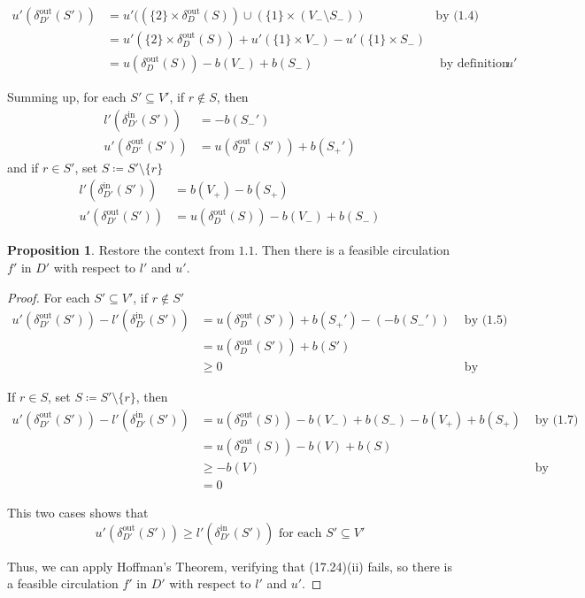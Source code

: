 \documentclass[a4paper,10pt, leqno]{article}
\theoremstyle{definition}
\begin{document}
\begin{align*}
 u'(\delta_{D'}^{\text{out}}(S')) &= u'((\{2\}\times\delta_{D}^{\text{out}}(S)) \cup (\{1\} \times (V_- \setminus S_-)) &\text{by (1.4)}\\
 &= u'(\{2\}\times\delta_{D}^{\text{out}}(S)) + u'(\{1\} \times V_-) - u'(\{1\} \times S_-) \\
 &= u(\delta_{D}^{\text{out}}(S)) - b(V_-) + b(S_-) &\text{ by definition of }u' 
\end{align*}

Summing up, for each $S' \subseteq V'$, if $r \notin S$, then
\begin{align*}
 \tag{1.5} l'(\delta_{D'}^{\text{in}}(S')) &= -b(S_-') \\
 \tag{1.6} u'(\delta_{D'}^{\text{out}}(S')) &= u(\delta_{D}^{\text{out}}(S')) + b(S_+')
\end{align*}
and if $r \in S'$, set $S \coloneqq S' \setminus \{r\} $
\begin{align*}
 \tag{1.7} l'(\delta_{D'}^{\text{in}}(S')) &= b(V_+) - b(S_+) \\
 \tag{1.8} u'(\delta_{D'}^{\text{out}}(S')) &= u(\delta_{D}^{\text{out}}(S)) - b(V_-) + b(S_-)
\end{align*}


\newtheorem{proposition}{Proposition}
\begin{proposition}
 Restore the context from $1.1$. Then there is a feasible circulation $f'$ in $D'$ with respect to $l'$ and $u'$.
\end{proposition}
\begin{proof}
For each $S' \subseteq V'$, if $r \notin S'$
\begin{align*}
 u'(\delta_{D'}^{\text{out}}(S')) - l'(\delta_{D'}^{\text{in}}(S')) &= u(\delta_{D}^{\text{out}}(S')) + b(S_+') - (-b(S_-')) &\text{ by (1.5) and (1.6)}\\
 &= u(\delta_D^{\text{out}}(S')) + b(S') \\
 &\geq 0 &\text{ by hypothesis} 
\end{align*}

If $r \in S$, set $S \coloneqq S' \setminus \{r\}$, then
\begin{align*}
 u'(\delta_{D'}^{\text{out}}(S')) - l'(\delta_{D'}^{\text{in}}(S')) &= u(\delta_{D}^{\text{out}}(S)) - b(V_-) + b(S_-) - b(V_+) + b(S_+) &\text{ by (1.7) and (1.8)}\\
 &= u(\delta_D^{\text{out}}(S)) - b(V) + b(S) \\
 &\geq -b(V) &\text{ by hypothesis} \\
 &= 0
\end{align*}

This two cases shows that 
$$ u'(\delta_{D'}^{\text{out}}(S')) \geq l'(\delta_{D'}^{\text{in}}(S')) \text{ for each } S' \subseteq V'$$

Thus, we can apply Hoffman's Theorem, verifying that (17.24)(ii) fails, so there is a feasible circulation $f'$ in $D'$ with respect to $l'$ and $u'$.
\end{proof}
\end{document}
